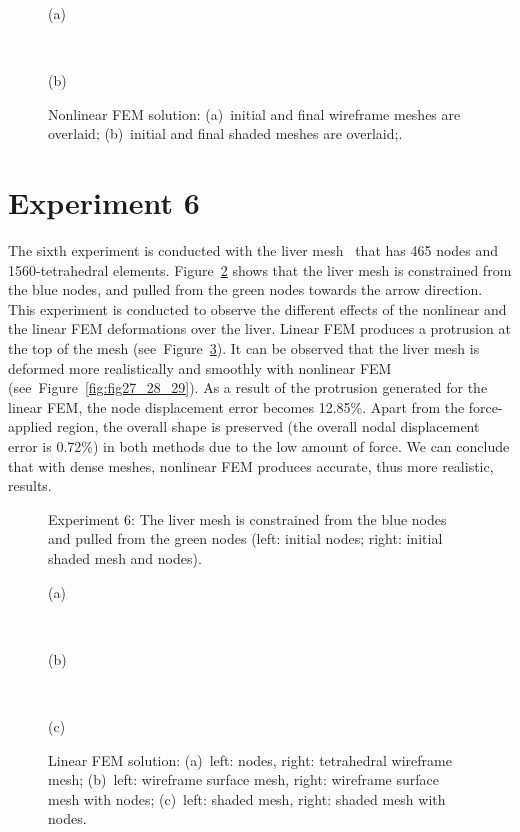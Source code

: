 \begin{figure}[h]
\centerline{}
\centerline{(a)}
\centerline{\ }
\centerline{}
\centerline{(b)}
\caption{Nonlinear FEM solution: (a)~initial and final wireframe meshes are overlaid; (b)~initial and final shaded meshes are overlaid;.}
\label{fig:fig21_22}
\end{figure}

\clearpage
\section{Experiment 6}
\label{vi}

The sixth experiment is conducted with the liver mesh~\cite{Liver2011} that has 465 nodes and 1560-tetrahedral elements. Figure~\ref{fig:fig23} shows that the liver mesh is constrained from the blue nodes, and pulled from the green nodes towards the arrow direction. This experiment is conducted to observe the different effects of the nonlinear and the linear FEM deformations over the liver. Linear FEM produces a protrusion at the top of the mesh (see~Figure~\ref{fig:fig24_25_26}). It can be observed that the liver mesh is deformed more realistically and smoothly with nonlinear FEM (see~Figure~\ref{fig:fig27_28_29}). As a result of the protrusion generated for the linear FEM, the node displacement error becomes 12.85\%. Apart from the force-applied region, the overall shape is preserved (the overall nodal displacement error is 0.72\%) in both methods due to the low amount of force. We can conclude that with dense meshes, nonlinear FEM produces accurate, thus more realistic, results.


\begin{figure}[h]
\centerline{}
\caption{Experiment 6: The liver mesh is constrained from the blue nodes and pulled from the green nodes (left: initial nodes; right: initial shaded mesh and nodes).}
\label{fig:fig23}
\end{figure}

\begin{figure}[h]
\centerline{}
\centerline{(a)}
\centerline{\ }
\centerline{}
\centerline{(b)}
\centerline{\ }
\centerline{}
\centerline{(c)}
\caption{Linear FEM solution: (a)~left: nodes, right: tetrahedral wireframe mesh;
                              (b)~left: wireframe surface mesh, right: wireframe surface mesh with nodes;
                              (c)~left: shaded mesh, right: shaded mesh with nodes.}
\label{fig:fig24_25_26}
\end{figure}

